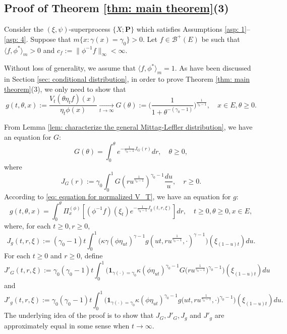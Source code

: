 \documentclass[12pt, a4paper]{amsart}
\theoremstyle{definition}
\numberwithin{equation}{section}
\begin{document}
\subsection{Proof of Theorem \ref{thm: main theorem}(3)}
\label{sec: proof of result 3}
	Consider the $(\xi, \psi)$-superprocess $\{X;\mathbf P\}$ which satisfies 
	Assumptions \ref{asp: 1}--\ref{asp: 4}.
	Suppose that $m\{ x:\gamma(x)=\gamma_0 \}>0$.
	Let $f \in \mathscr B^+(E)$ be  such that $ \langle f, \phi^* \rangle_m > 0$  and $c_f:=\| \phi^{-1}f \|_\infty < \infty$.
	
	Without loss of generality, we assume that $\langle f, \phi^* \rangle_m = 1$.
	As have been discussed in Section \ref{sec: conditional distribution}, 
	in order to prove Theorem \ref{thm: main theorem}(3), we only need to show that
\[
	g(t,\theta,x)
	:=\frac{V_t (\theta \eta_t f) (x)}{\eta_t \phi(x)}
	\xrightarrow[t\to \infty]{} G(\theta)
	:= \Big( \frac{1}{1+\theta^{-(\gamma_0 - 1)}} \Big)^{ \frac{1}{\gamma_0 - 1} },
	\quad x\in E, \theta \geq 0.
\]
	
	From Lemma \ref{lem: characterize the general Mittag-Leffler distribution}, we have an equation for $G$:
\[\label{eq: equation for G}
	G(\theta)
	= \int_0^\theta e^{ - \frac{1} {\gamma_0 - 1} J_G(r)} dr,
	\quad \theta \geq 0,
\]
	where
\[\label{eq: definition for J_G}
	J_G(r):=
	\gamma_0 \int_0^1 G(ru^{\frac{1}{\gamma_0 - 1}}) ^{\gamma_0 - 1}\frac{du}{u},
	\quad r\geq 0 .
\]
	According to \eqref{eq: equation for normalized V_T}, we have an equation for $g$:
\[\label{eq: equation for g}
	g(t,\theta, x)= \int_0^{\theta} \Pi_x^{(\phi)} [ (\phi^{-1}f)(\xi_t) e^{-\frac{1}{\gamma_0 - 1} J_g(t,r,\xi) } ] dr,
	\quad t\geq 0, \theta \geq 0, x\in E,
\]
	where, for each $t\geq 0, r\geq 0$,
\[\label{eq: definition for J_g}
	J_g(t,r,\xi):=
	(\gamma_0 - 1)t\int_0^1 \big(  \kappa\gamma (   \phi \eta_{ut}  )^{\gamma - 1} g (ut,ru^{\frac{1}{\gamma_0 - 1}},\cdot )^{\gamma-1}  \big) (  \xi_{(1-u)t}  ) du.
\]
	For each $t\geq 0$ and $r\geq 0$, define
\[\label{eq: definition of J'_G}
	J'_G(t,r,\xi):=
	\gamma_0 (\gamma_0 - 1) t \int_0^1 \big( \mathbf 1_{\gamma(\cdot) = \gamma_0} \kappa (\phi \eta_{ut})^{\gamma_0 - 1} G\big( ru^{\frac{1}{\gamma_0 - 1}} \big) ^{\gamma_0 - 1} \big) (\xi_{(1-u)t}) du
\]
	and
\[\label{eq: definition of J'_g}
	J'_g(t,r,\xi):=
	\gamma_0 (\gamma_0 - 1) t \int_0^1 \big( \mathbf 1_{\gamma(\cdot) = \gamma_0} \kappa (\phi \eta_{ut})^{\gamma_0 - 1} g\big( ut,ru^{\frac{1}{\gamma_0 - 1}}, \cdot \big)^{\gamma_0 - 1}  \big) (\xi_{(1-u)t})  du.
\]
	The underlying idea of the proof is to show that $J_G,J'_G,J_g$ and $J'_g$ are approximately equal in some sense when $t\to \infty$.
	
\end{document}

